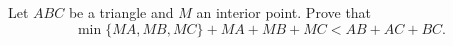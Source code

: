 Let $ABC$ be a triangle and $M$ an interior point. Prove that
\[
\min\{MA, MB, MC\} + MA + MB + MC < AB + AC + BC.
\]

